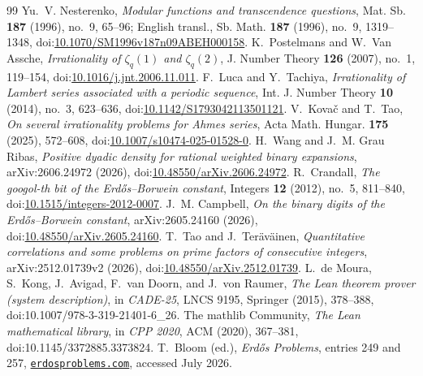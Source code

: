 \documentclass[11pt]{article}
\theoremstyle{definition}
\theoremstyle{remark}
\begin{document}
\begin{thebibliography}{99}
 Yu.~V. Nesterenko, \emph{Modular functions and transcendence questions},
  Mat. Sb. \textbf{187} (1996), no.~9, 65--96; English transl., Sb. Math. \textbf{187} (1996), no.~9, 1319--1348,
  doi:\href{https://doi.org/10.1070/SM1996v187n09ABEH000158}{10.1070/SM1996v187n09ABEH000158}.
 K.~Postelmans and W.~Van Assche,
  \emph{Irrationality of $\zeta_q(1)$ and $\zeta_q(2)$},
  J. Number Theory \textbf{126} (2007), no.~1, 119--154,
  doi:\href{https://doi.org/10.1016/j.jnt.2006.11.011}{10.1016/j.jnt.2006.11.011}.
 F.~Luca and Y.~Tachiya, \emph{Irrationality of Lambert series associated
  with a periodic sequence}, Int. J. Number Theory \textbf{10} (2014), no.~3, 623--636,
  doi:\href{https://doi.org/10.1142/S1793042113501121}{10.1142/S1793042113501121}.
 V.~Kova\v{c} and T.~Tao, \emph{On several irrationality problems for
  Ahmes series}, Acta Math. Hungar. \textbf{175} (2025), 572--608,
  doi:\href{https://doi.org/10.1007/s10474-025-01528-0}{10.1007/s10474-025-01528-0}.
 H.~Wang and J.~M. Grau Ribas, \emph{Positive dyadic density for
  rational weighted binary expansions}, arXiv:2606.24972 (2026),
  doi:\href{https://doi.org/10.48550/arXiv.2606.24972}{10.48550/arXiv.2606.24972}.
 R.~Crandall, \emph{The googol-th bit of the Erd\H{o}s--Borwein constant},
  Integers \textbf{12} (2012), no.~5, 811--840,
  doi:\href{https://doi.org/10.1515/integers-2012-0007}{10.1515/integers-2012-0007}.
 J.~M. Campbell, \emph{On the binary digits of the Erd\H{o}s--Borwein
  constant}, arXiv:2605.24160 (2026),
  doi:\href{https://doi.org/10.48550/arXiv.2605.24160}{10.48550/arXiv.2605.24160}.
 T.~Tao and J.~Ter\"av\"ainen, \emph{Quantitative correlations and
  some problems on prime factors of consecutive integers}, arXiv:2512.01739v2 (2026),
  doi:\href{https://doi.org/10.48550/arXiv.2512.01739}{10.48550/arXiv.2512.01739}.
 L.~de Moura, S.~Kong, J.~Avigad, F.~van Doorn, and J.~von Raumer,
  \emph{The Lean theorem prover (system description)}, in \emph{CADE-25}, LNCS 9195,
  Springer (2015), 378--388, doi:10.1007/978-3-319-21401-6\_26.
 The mathlib Community, \emph{The Lean mathematical library},
  in \emph{CPP 2020}, ACM (2020), 367--381, doi:10.1145/3372885.3373824.
 T.~Bloom (ed.), \emph{Erd\H{o}s Problems}, entries 249 and 257,
  \href{https://www.erdosproblems.com}{\texttt{erdosproblems.com}}, accessed July 2026.
\end{thebibliography}
\end{document}
